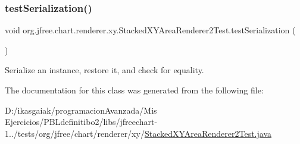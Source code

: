 \subsubsection{\texorpdfstring{test\+Serialization()}{testSerialization()}}
{\footnotesize\ttfamily void org.\+jfree.\+chart.\+renderer.\+xy.\+Stacked\+X\+Y\+Area\+Renderer2\+Test.\+test\+Serialization (\begin{DoxyParamCaption}{ }\end{DoxyParamCaption})}

Serialize an instance, restore it, and check for equality. 

The documentation for this class was generated from the following file\+:\begin{DoxyCompactItemize}
\item 
D\+:/ikasgaiak/programacion\+Avanzada/\+Mis Ejercicios/\+P\+B\+Ldefinitibo2/libs/jfreechart-\/1../tests/org/jfree/chart/renderer/xy/\mbox{\hyperlink{_stacked_x_y_area_renderer2_test_8java}{Stacked\+X\+Y\+Area\+Renderer2\+Test.\+java}}\end{DoxyCompactItemize}
